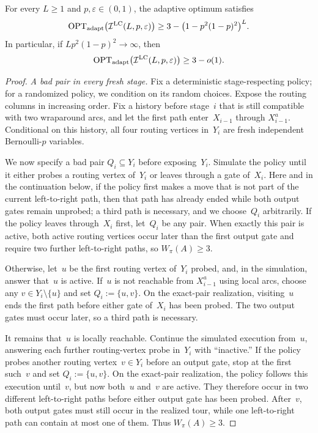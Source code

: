 \documentclass[12pt,a4paper,oneside]{report}
\begin{document}
\begin{lemma}
\label{lem:layered-column-adaptive}
For every $L\ge1$ and $p,\varepsilon\in(0,1)$, the adaptive optimum
satisfies
\[
    \operatorname{OPT}_\mathrm{adapt}\bigl(\mathcal I^{\mathrm{LC}}(L,p,\varepsilon)\bigr)
    \ge
    3-\bigl(1-p^2(1-p)^2\bigr)^L.
\]
In particular, if $Lp^2(1-p)^2\to\infty$, then
\[
    \operatorname{OPT}_\mathrm{adapt}\bigl(\mathcal I^{\mathrm{LC}}(L,p,\varepsilon)\bigr)
    \ge3-o(1).
\]
\end{lemma}
\begin{proof}
\emph{A bad pair in every fresh stage.}
Fix a deterministic stage-respecting policy; for a randomized policy, we
condition on its random choices.  Expose the routing columns in increasing
order.  Fix a history before stage~$i$ that is still compatible with two
wraparound arcs, and let the first path enter~$X_{i-1}$ through
$X_{i-1}^a$.  Conditional on this history, all four routing vertices in~$Y_i$ are
fresh independent Bernoulli-$p$ variables.

We now specify a bad pair $Q_i\subseteq Y_i$ before exposing~$Y_i$.  Simulate
the policy until it either probes a routing vertex of~$Y_i$ or
leaves through a gate of~$X_i$.  Here and in the continuation below, if the
policy first makes a move that is not part of the current left-to-right path,
then that path has already ended while both output gates remain unprobed; a
third path is necessary, and we choose~$Q_i$ arbitrarily.  If the policy
leaves through~$X_i$ first, let~$Q_i$ be any pair.
When exactly this pair is active, both active routing vertices occur later than the
first output gate and require two further left-to-right paths, so
$W_\pi(A)\ge3$.

Otherwise, let~$u$ be the first routing vertex of~$Y_i$ probed, and, in the
simulation, answer that~$u$ is active.  If~$u$ is not reachable from
$X_{i-1}^a$ using local arcs, choose any $v\in Y_i\setminus\{u\}$ and set
$Q_i:=\{u,v\}$.  On the exact-pair realization, visiting~$u$ ends the first
path before either gate of~$X_i$ has been probed.  The two output gates must
occur later, so a third path is necessary.

It remains that~$u$ is locally reachable.  Continue the simulated
execution from~$u$, answering each further routing-vertex probe in~$Y_i$ with
``inactive.''  If the policy probes another routing vertex~$v\in Y_i$ before an
output gate, stop at the first such~$v$ and set $Q_i:=\{u,v\}$.  On the
exact-pair realization, the policy follows this execution until~$v$, but now
both~$u$ and~$v$ are active.  They therefore occur in two different
left-to-right paths before either output gate has been probed.  After~$v$,
both output gates must still occur in the realized tour, while one
left-to-right path can contain at most one of them.  Thus $W_\pi(A)\ge3$.


\end{proof}
\end{document}
